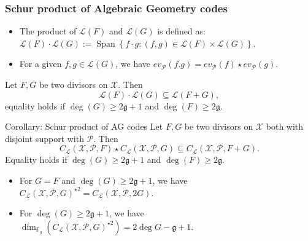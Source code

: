 \documentclass[
10pt, %
%
aspectratio=169, %
]{beamer}
\theoremstyle{plain}%
\theoremstyle{definition}
\theoremstyle{remark}
\newcommand{\calP}{\mathcal{P}}
\newcommand{\calL}{\mathcal{L}}
\newcommand{\calX}{\mathcal{X}}
\newcommand{\fq}{\mathbb{F}_{q}}
\newcommand{\Span}[1]{\operatorname{Span}\left\lbrace #1\right\rbrace }
\begin{document}
\begin{frame}
	\frametitle{Schur product of Algebraic Geometry codes}
	\begin{itemize}
		\item[\textrightarrow] The product of $\calL(F)$ and $\calL(G)$ is defined as:
		$\calL(F) \cdot \calL(G) := \Span{ f \cdot g : (f,g) \in \calL(F) \times \calL(G)}$.
		\item[\textrightarrow] For a given $f,g \in \calL(G)$, we have $ev_{\calP}(f.g)=ev_{\calP}(f)\star ev_{\calP}(g)$.
	\end{itemize}
	\begin{block}{{\cite[Theorem]{Mum70}}}
		Let $F,G$ be two divisors on $\calX$. Then
		\vspace{-0.9em}
		\[ \calL(F) \cdot \calL(G) \subseteq \calL(F+G),\]
		equality holds if $\deg(G) \geq 2\mathfrak{g}+1$ and  $\deg(F) \geq 2\mathfrak{g}$.
	\end{block}
\begin{alertblock}{Corollary: Schur product of AG codes}
	Let $F,G$ be two divisors on $\calX$ both with disjoint support with $\calP$. Then
	\vspace{-0.9em}
	\[C_{\calL}(\calX,\mathcal{P},F)\star C_{\calL}(\calX,\mathcal{P},G)\subseteq C_{\calL}(\calX,\mathcal{P},F+G).\]
	Equality holds if $\deg(G) \geq 2\mathfrak{g}+1$ and  $\deg(F) \geq 2\mathfrak{g}$.
\end{alertblock}
	\begin{itemize}
		\item For $G=F$ and $\deg(G) \geq 2\mathfrak{g}+1$, we have $C_{\calL}(\calX,\mathcal{P},G)^{\star2} = C_{\calL}(\calX,\calP,2G)$.
		\item For $\deg(G) \geq 2\mathfrak{g}+1$, we have $\dim_{\fq}(C_{\calL}(\calX,\mathcal{P},G)^{\star2})=2\deg G - \mathfrak{g} + 1$.
	\end{itemize}
\end{frame}
\end{document}
